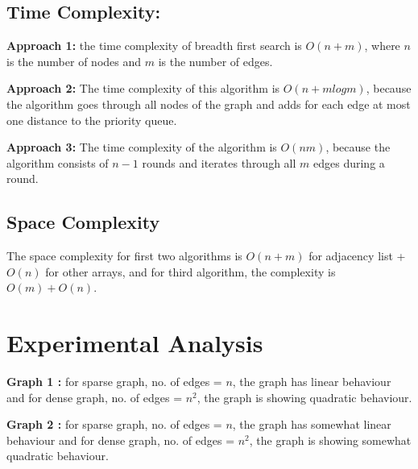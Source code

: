\documentclass[conference]{IEEEtran}
\begin{document}
\subsection{Time Complexity:}

\textbf{Approach 1:} 
the time complexity of breadth first search is $O ( n + m )$, where $n$ is the number of nodes and $m$ is the number of edges.

\textbf{Approach 2:} 
The time complexity of this algorithm is $O ( n + m log m )$, because
the algorithm goes through all nodes of the graph and adds for each edge at most
one distance to the priority queue.

\textbf{Approach 3:}
The time complexity of the algorithm is $O ( nm )$, because the algorithm consists of $n-1$ rounds and iterates through all $m$ edges during a round.
\subsection{Space Complexity}
The space complexity for first two algorithms is $O(n+m)$ for adjacency list + $O(n)$ for other arrays, and for third algorithm, the complexity is $O(m)+O(n)$.


\section{Experimental Analysis}

\textbf{Graph 1 :} for sparse graph, no. of edges = $n$, the graph has linear behaviour and for dense graph, no. of edges = $n^2$, the graph is showing quadratic behaviour.

\textbf{Graph 2 :} for sparse graph, no. of edges = $n$, the graph has somewhat linear behaviour and for dense graph, no. of edges = $n^2$, the graph is showing somewhat quadratic behaviour.
\end{document}
